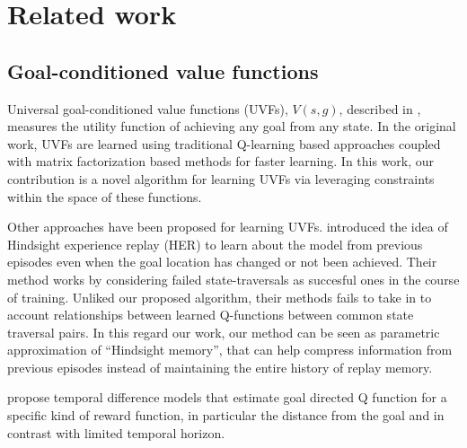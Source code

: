 
\section{Related work}
\subsection{Goal-conditioned value functions}

Universal goal-conditioned value functions (UVFs), $V(s,g)$, described in
\citet{schaul2015universal}, measures the utility function of achieving any goal
from any state. In the original work, UVFs are learned using traditional
Q-learning based approaches coupled with matrix factorization based
methods for faster learning. In this work, our contribution is a novel
algorithm for learning UVFs via leveraging constraints within the space
of these functions. 

Other approaches have been proposed for learning UVFs.
\citet{andrychowicz2016learning} introduced the idea of Hindsight
experience replay (HER) to learn about the model from previous episodes
even when the goal location has changed or not been achieved.  Their
method works by considering failed state-traversals as succesful ones in
the course of training. Unliked our proposed algorithm, their methods
fails to take in to account relationships between learned Q-functions
between common state traversal pairs. In this regard our work, our
method can be seen as parametric approximation of ``Hindsight memory'',
that can help compress information from previous episodes instead of
maintaining the entire history of replay memory.

\cite{pong2018temporal} propose temporal difference models that estimate
goal directed Q function for a specific kind of reward function, in
particular the distance from the goal and in contrast with limited
temporal horizon.

